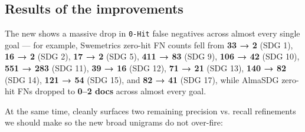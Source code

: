 \subsection{Results of the improvements}

The new  shows a massive drop in \texttt{0-Hit} false negatives across almost every single goal --- for example, Swemetrics zero-hit FN counts fell from \textbf{33 → 2} (SDG 1), \textbf{16 → 2} (SDG 2), \textbf{17 → 2} (SDG 5), \textbf{411 → 83} (SDG 9), \textbf{106 → 42} (SDG 10), \textbf{551 → 283} (SDG 11), \textbf{39 → 16} (SDG 12), \textbf{71 → 21} (SDG 13), \textbf{140 → 82} (SDG 14), \textbf{121 → 54} (SDG 15), and \textbf{82 → 41} (SDG 17), while AlmaSDG zero-hit FNs dropped to \textbf{0–2 docs} across almost every goal.

At the same time,  cleanly surfaces two remaining precision vs. recall refinements we should make so the new broad unigrams do not over-fire:
